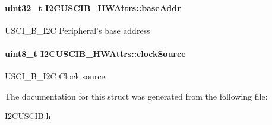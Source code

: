 \paragraph[{base\-Addr}]{\setlength{\rightskip}{0pt plus 5cm}uint32\-\_\-t I2\-C\-U\-S\-C\-I\-B\-\_\-\-H\-W\-Attrs\-::base\-Addr}\label{struct_i2_c_u_s_c_i_b___h_w_attrs_ac86e653a2babe8e0e8c20d044d7f87ad}
U\-S\-C\-I\-\_\-\-B\-\_\-\-I2\-C Peripheral's base address 
\paragraph[{clock\-Source}]{\setlength{\rightskip}{0pt plus 5cm}uint8\-\_\-t I2\-C\-U\-S\-C\-I\-B\-\_\-\-H\-W\-Attrs\-::clock\-Source}\label{struct_i2_c_u_s_c_i_b___h_w_attrs_aca93346c6e87c42ee11c3742bd85e79d}
U\-S\-C\-I\-\_\-\-B\-\_\-\-I2\-C Clock source 

The documentation for this struct was generated from the following file\-:\begin{DoxyCompactItemize}
\item 
\hyperlink{_i2_c_u_s_c_i_b_8h}{I2\-C\-U\-S\-C\-I\-B.\-h}\end{DoxyCompactItemize}
